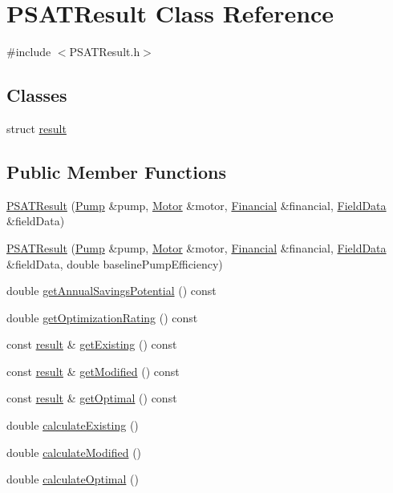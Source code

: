 \hypertarget{class_p_s_a_t_result}{}\section{P\+S\+A\+T\+Result Class Reference}
\label{class_p_s_a_t_result}


{\ttfamily \#include $<$P\+S\+A\+T\+Result.\+h$>$}

\subsection*{Classes}
\begin{DoxyCompactItemize}
\item 
struct \hyperlink{struct_p_s_a_t_result_1_1result}{result}
\end{DoxyCompactItemize}
\subsection*{Public Member Functions}
\begin{DoxyCompactItemize}
\item 
\hyperlink{class_p_s_a_t_result_af6f9d5dbd3a6aac3d7e5e212e3a40487}{P\+S\+A\+T\+Result} (\hyperlink{class_pump}{Pump} \&pump, \hyperlink{class_motor}{Motor} \&motor, \hyperlink{class_financial}{Financial} \&financial, \hyperlink{class_field_data}{Field\+Data} \&field\+Data)
\item 
\hyperlink{class_p_s_a_t_result_a89db10b4bcc52985fbb36e8c5afce2ab}{P\+S\+A\+T\+Result} (\hyperlink{class_pump}{Pump} \&pump, \hyperlink{class_motor}{Motor} \&motor, \hyperlink{class_financial}{Financial} \&financial, \hyperlink{class_field_data}{Field\+Data} \&field\+Data, double baseline\+Pump\+Efficiency)
\item 
double \hyperlink{class_p_s_a_t_result_a14fc75c2e0e92f74e3df1b97ed13b496}{get\+Annual\+Savings\+Potential} () const
\item 
double \hyperlink{class_p_s_a_t_result_aa0a7001461408fcb06a6c22ce2d064db}{get\+Optimization\+Rating} () const
\item 
const \hyperlink{struct_p_s_a_t_result_1_1result}{result} \& \hyperlink{class_p_s_a_t_result_aa0140a6dc6c2682680633cbd90737278}{get\+Existing} () const
\item 
const \hyperlink{struct_p_s_a_t_result_1_1result}{result} \& \hyperlink{class_p_s_a_t_result_a2a477033ed957ddac39ae1e5e7df38a8}{get\+Modified} () const
\item 
const \hyperlink{struct_p_s_a_t_result_1_1result}{result} \& \hyperlink{class_p_s_a_t_result_a755c1b708e4f684ee0cc5d6ca9292286}{get\+Optimal} () const
\item 
double \hyperlink{class_p_s_a_t_result_a594e019e535fb402d6d0441d50f8b697}{calculate\+Existing} ()
\item 
double \hyperlink{class_p_s_a_t_result_afbb68257a28c1b853d26faf3227461cc}{calculate\+Modified} ()
\item 
double \hyperlink{class_p_s_a_t_result_a25d50cd89b326f18449496a56d54f472}{calculate\+Optimal} ()
\end{DoxyCompactItemize}


